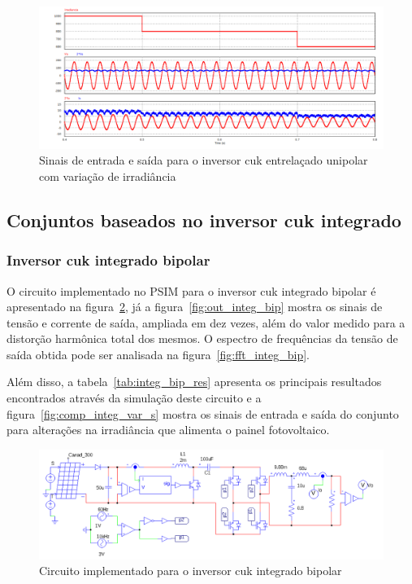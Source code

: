 \documentclass[
	12pt,				%
	openany,
	onseside,
	a4paper,			%
	english,			%
	french,				%
	spanish,			%
	brazil,				%
	]{abntex2}
\begin{document}
\begin{figure}[H]%
	\captionsetup{justification=centering}
	\centering
		\includegraphics[width= \linewidth]{comp_interv_var_s_unip}
		\caption{Sinais de entrada e saída para o inversor cuk entrelaçado unipolar com variação de irradiância}
		\label{fig:comp_interv_var_s_unip}
\end{figure}

\subsection{Conjuntos baseados no inversor cuk integrado}

\subsubsection{Inversor cuk integrado bipolar}

O circuito implementado no PSIM para o inversor cuk integrado bipolar é apresentado na figura~\ref{fig:comp_integ_circ_clean}, já a figura~\ref{fig:out_integ_bip} mostra os sinais de tensão e corrente de saída, ampliada em dez vezes, além do valor medido para a distorção harmônica total dos mesmos. O espectro de frequências da tensão de saída obtida pode ser analisada na figura~\ref{fig:fft_integ_bip}.

Além disso, a tabela~\ref{tab:integ_bip_res} apresenta os principais resultados encontrados através da simulação deste circuito e a figura~\ref{fig:comp_integ_var_s} mostra os sinais de entrada e saída do conjunto para alterações na irradiância que alimenta o painel fotovoltaico.

\begin{figure}[H]%
	\captionsetup{justification=centering}
	\centering
		\includegraphics[width= \linewidth]{comp_integ_circ_clean}
		\caption{Circuito implementado para o inversor cuk integrado bipolar}
		\label{fig:comp_integ_circ_clean}
\end{figure}
\end{document}
